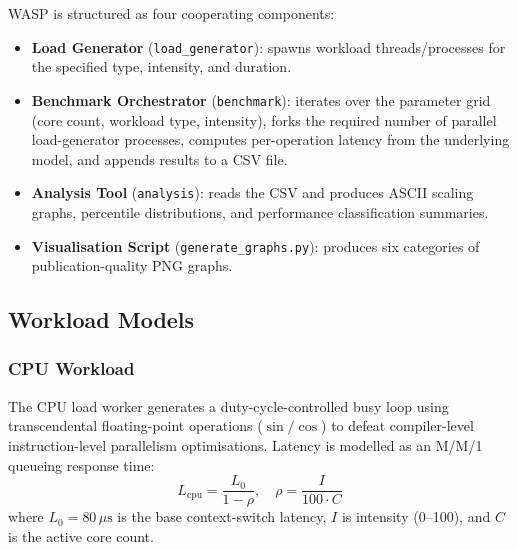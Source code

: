 \documentclass[conference]{IEEEtran}
\begin{document}
WASP is structured as four cooperating components:
\begin{itemize}
  \item \textbf{Load Generator} (\texttt{load\_generator}): spawns workload
        threads/processes for the specified type, intensity, and duration.
  \item \textbf{Benchmark Orchestrator} (\texttt{benchmark}): iterates over
        the parameter grid (core count, workload type, intensity), forks the
        required number of parallel load-generator processes, computes
        per-operation latency from the underlying model, and appends results
        to a CSV file.
  \item \textbf{Analysis Tool} (\texttt{analysis}): reads the CSV and
        produces ASCII scaling graphs, percentile distributions, and
        performance classification summaries.
  \item \textbf{Visualisation Script} (\texttt{generate\_graphs.py}):
        produces six categories of publication-quality PNG graphs.
\end{itemize}

\subsection{Workload Models}

\subsubsection{CPU Workload}
The CPU load worker generates a duty-cycle-controlled busy loop using
transcendental floating-point operations ($\sin/\cos$) to defeat
compiler-level instruction-level parallelism optimisations.
Latency is modelled as an M/M/1 queueing response time:
\begin{equation}
  L_{\text{cpu}} = \frac{L_0}{1 - \rho}, \quad
  \rho = \frac{I}{100 \cdot C}
\end{equation}
where $L_0 = 80\,\mu\text{s}$ is the base context-switch latency,
$I$ is intensity (0--100), and $C$ is the active core count.
\end{document}
